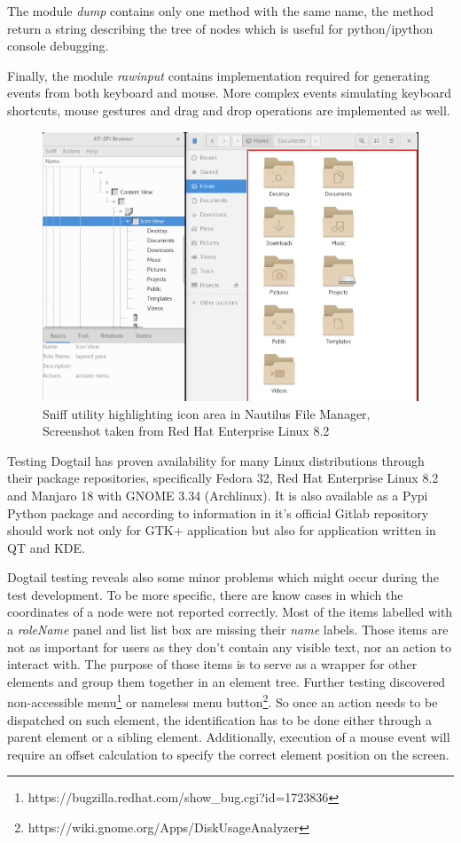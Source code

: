 The module \textit{dump} contains only one method with the same name, the method return a string describing the tree of nodes which is useful for python/ipython console debugging.

Finally, the module \textit{rawinput} contains implementation required for generating events from both keyboard and mouse. More complex events simulating keyboard shortcuts, mouse gestures and drag and drop operations are implemented as well.  


 \begin{figure}[hbt]
	\centering
	\includegraphics[width=1\textwidth]{obrazky-figures/sniff.png}
	\caption{Sniff utility highlighting icon area in Nautilus File Manager, Screenshot taken from Red Hat Enterprise Linux 8.2}
	\label{sniff}
\end{figure}

 Testing Dogtail has proven availability for many Linux distributions through their package repositories, specifically Fedora 32, Red Hat Enterprise Linux 8.2 and Manjaro 18 with GNOME 3.34 (Archlinux). It is also available as a Pypi Python package and according to information in it's official Gitlab repository should work not only for GTK+ application but also for application written in QT and KDE. 
 
 Dogtail testing reveals also some minor problems which might occur during the test development. To be more specific, there are know cases in which the coordinates of a node were not reported correctly. Most of the items labelled with a \textit{roleName} panel and list list box are missing their \textit{name} labels. Those items are not as important for users as they don't contain any visible text, nor an action to interact with. The purpose of those items is to serve as a wrapper for other elements and group them together in an element tree. Further testing discovered non-accessible menu\footnote{https://bugzilla.redhat.com/show_bug.cgi?id=1723836} or nameless menu button\footnote{https://wiki.gnome.org/Apps/DiskUsageAnalyzer}. So once an action needs to be dispatched on such element, the identification has to be done either through a parent element or a sibling element. Additionally, execution of a mouse event will require an offset calculation to specify the correct element position on the screen.
 
